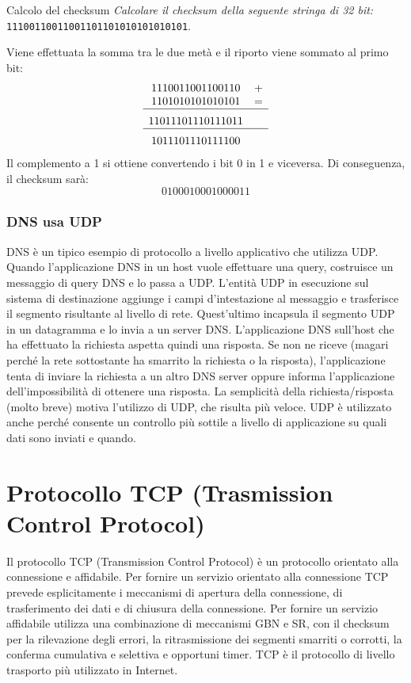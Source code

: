 \begin{Example}{Calcolo del checksum}{}
    \textit{Calcolare il checksum della seguente stringa di 32 bit:} \verb|11100110011001101101010101010101|.

    Viene effettuata la somma tra le due metà e il riporto viene sommato al primo bit:
    \begin{equation*}
    \begin{array}{cc}
        1110011001100110 & +\\
        1101010101010101 & =\\
        \cline{1-2}
        \rule[0mm]{0cm}{5mm}
        11011101110111011&\\
         \cline{1-2}
        \rule[0mm]{0cm}{5mm}
        1011101110111100
    \end{array}
    \end{equation*}
    Il complemento a 1 si ottiene convertendo i bit 0 in 1 e viceversa. Di conseguenza, il checksum sarà:
    \begin{equation*}
        0100010001000011
    \end{equation*}
\end{Example}

\subsubsection*{DNS usa UDP}
DNS è un tipico esempio di protocollo a livello applicativo che utilizza UDP. Quando l'applicazione DNS in un host vuole effettuare una query, costruisce un messaggio di query DNS e lo passa a UDP. L'entità UDP in esecuzione sul sistema di destinazione aggiunge i campi d'intestazione al messaggio e trasferisce il segmento risultante al livello di rete. Quest'ultimo incapsula il segmento UDP in un datagramma e lo invia a un server DNS. L'applicazione DNS sull'host che ha effettuato la richiesta aspetta quindi una risposta. Se non ne riceve (magari perché la rete sottostante ha smarrito la richiesta o la risposta), l'applicazione tenta di inviare la richiesta a un altro DNS server oppure informa l'applicazione dell'impossibilità di ottenere una risposta. La semplicità della richiesta/risposta (molto breve) motiva l'utilizzo di UDP, che risulta più veloce. UDP è utilizzato anche perché consente un controllo più sottile a livello di applicazione su quali dati sono inviati e quando.

\section{Protocollo TCP (Trasmission Control Protocol)}
Il protocollo TCP (Transmission Control Protocol) è un protocollo orientato alla connessione e affidabile. Per fornire un servizio orientato alla connessione TCP prevede esplicitamente i meccanismi di apertura della connessione, di trasferimento dei dati e di chiusura della connessione. Per fornire un servizio affidabile utilizza una combinazione di meccanismi GBN e SR, con il checksum per la rilevazione degli errori, la ritrasmissione dei segmenti smarriti o corrotti, la conferma cumulativa e selettiva e opportuni timer. TCP è il protocollo di livello trasporto più utilizzato in Internet.

